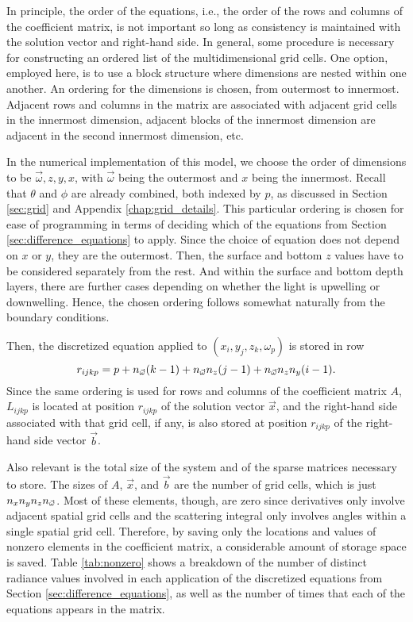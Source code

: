 In principle, the order of the equations, i.e., the order of the rows and columns of the coefficient matrix, is not important
so long as consistency is maintained with the solution vector and right-hand side.
In general, some procedure is necessary for constructing an ordered list of the multidimensional grid cells.
One option, employed here, is to use a block structure where dimensions are nested within one another.
An ordering for the dimensions is chosen, from outermost to innermost.
Adjacent rows and columns in the matrix are associated with adjacent grid cells in the innermost dimension,
adjacent blocks of the innermost dimension are adjacent in the second innermost dimension, etc.

In the numerical implementation of this model, we choose the order of dimensions to be $\vec{\omega}, z, y, x$, with $\vec{\omega}$ being the outermost and $x$ being the innermost.
Recall that $\theta$ and $\phi$ are already combined, both indexed by $p$, as discussed in Section \ref{sec:grid} and Appendix \ref{chap:grid_details}.
This particular ordering is chosen for ease of programming in terms of deciding which of the equations from Section \ref{sec:difference_equations} to apply.
Since the choice of equation does not depend on $x$ or $y$, they are the outermost.
Then, the surface and bottom $z$ values have to be considered separately from the rest.
And within the surface and bottom depth layers, there are further cases depending on whether the light is upwelling or downwelling.
Hence, the chosen ordering follows somewhat naturally from the boundary conditions.

Then, the discretized equation applied to $(x_i, y_j, z_k, \omega_p)$ is stored in row
\begin{equation*}
  r_{ijkp} = p + {n_{\vec{\omega}}} (k-1) + {n_{\vec{\omega}}} n_z (j-1) + {n_{\vec{\omega}}} n_z n_y (i-1).
\end{equation*}
Since the same ordering is used for rows and columns of the coefficient matrix $A$, $L_{ijkp}$ is located at position $r_{ijkp}$ of the solution vector $\vec{x}$,
and the right-hand side associated with that grid cell, if any, is also stored at position $r_{ijkp}$ of the right-hand side vector $\vec{b}$.

Also relevant is the total size of the system and of the sparse matrices necessary to store.
The sizes of $A$, $\vec{x}$, and $\vec{b}$ are the number of grid cells, which is just $n_xn_yn_z{n_{\vec{\omega}}}$.
Most of these elements, though, are zero since derivatives only involve adjacent spatial grid cells and the scattering integral only involves angles within a single spatial grid cell.
Therefore, by saving only the locations and values of nonzero elements in the coefficient matrix, a considerable amount of storage space is saved.
Table \ref{tab:nonzero} shows a breakdown of the number of distinct radiance values involved in each application of the discretized equations from Section \ref{sec:difference_equations}, as well as the number of times that each of the equations appears in the matrix.


